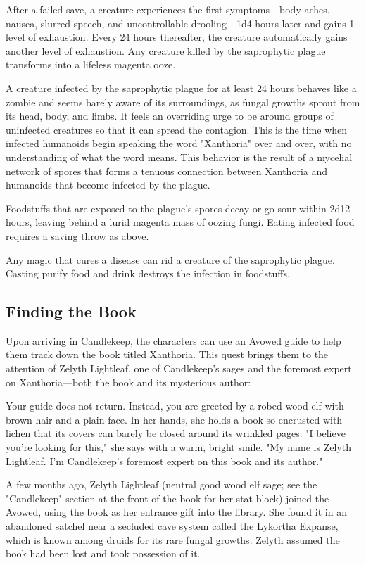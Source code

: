 \documentclass[10pt,a4paper,twoside,bg=print,twocolumn,openany,nodeprecatedcode]{dndbook}
\begin{document}
After a failed save, a creature experiences the first symptoms—body aches, nausea, slurred speech, and uncontrollable drooling—1d4 hours later and gains 1 level of exhaustion. Every 24 hours thereafter, the creature automatically gains another level of exhaustion. Any creature killed by the saprophytic plague transforms into a lifeless magenta ooze.

A creature infected by the saprophytic plague for at least 24 hours behaves like a zombie and seems barely aware of its surroundings, as fungal growths sprout from its head, body, and limbs. It feels an overriding urge to be around groups of uninfected creatures so that it can spread the contagion. This is the time when infected humanoids begin speaking the word "Xanthoria" over and over, with no understanding of what the word means. This behavior is the result of a mycelial network of spores that forms a tenuous connection between Xanthoria and humanoids that become infected by the plague.

Foodstuffs that are exposed to the plague's spores decay or go sour within 2d12 hours, leaving behind a lurid magenta mass of oozing fungi. Eating infected food requires a saving throw as above.

Any magic that cures a disease can rid a creature of the saprophytic plague. Casting purify food and drink destroys the infection in foodstuffs.

\subsection{Finding the Book}
Upon arriving in Candlekeep, the characters can use an Avowed guide to help them track down the book titled Xanthoria. This quest brings them to the attention of Zelyth Lightleaf, one of Candlekeep's sages and the foremost expert on Xanthoria—both the book and its mysterious author:

\begin{DndReadAloud}{}
Your guide does not return. Instead, you are greeted by a robed wood elf with brown hair and a plain face. In her hands, she holds a book so encrusted with lichen that its covers can barely be closed around its wrinkled pages. "I believe you're looking for this," she says with a warm, bright smile. "My name is Zelyth Lightleaf. I'm Candlekeep's foremost expert on this book and its author."

\end{DndReadAloud}

A few months ago, Zelyth Lightleaf (neutral good wood elf sage; see the "Candlekeep" section at the front of the book for her stat block) joined the Avowed, using the book as her entrance gift into the library. She found it in an abandoned satchel near a secluded cave system called the Lykortha Expanse, which is known among druids for its rare fungal growths. Zelyth assumed the book had been lost and took possession of it.
\end{document}
